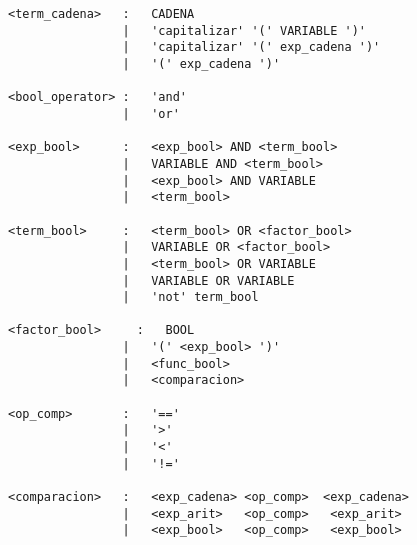 \begin{verbatim}
<term_cadena>   :   CADENA
                |   'capitalizar' '(' VARIABLE ')'
                |   'capitalizar' '(' exp_cadena ')'
                |   '(' exp_cadena ')'

<bool_operator> :   'and'
                |   'or'

<exp_bool>      :   <exp_bool> AND <term_bool>
                |   VARIABLE AND <term_bool>
                |   <exp_bool> AND VARIABLE
                |   <term_bool>

<term_bool>     :   <term_bool> OR <factor_bool>
                |   VARIABLE OR <factor_bool>
                |   <term_bool> OR VARIABLE
                |   VARIABLE OR VARIABLE
                |   'not' term_bool

<factor_bool>     :   BOOL
                |   '(' <exp_bool> ')'
                |   <func_bool>
                |   <comparacion>

<op_comp>       :   '=='
                |   '>'
                |   '<'
                |   '!='

<comparacion>   :   <exp_cadena> <op_comp>  <exp_cadena>
                |   <exp_arit>   <op_comp>   <exp_arit>
                |   <exp_bool>   <op_comp>   <exp_bool>

    
\end{verbatim}
